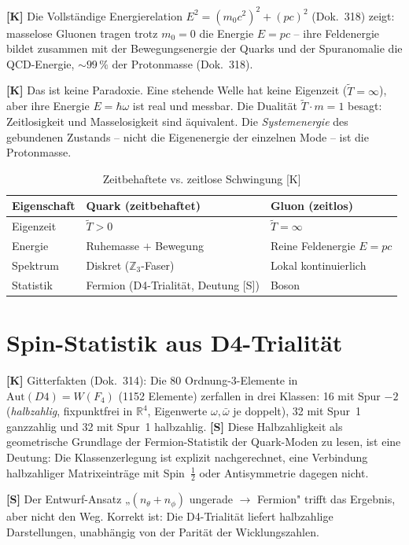 \textbf{[K]} Die Vollständige Energierelation
$E^2 = (m_0 c^2)^2 + (pc)^2$ (Dok.~318) zeigt: masselose Gluonen
tragen trotz $m_0 = 0$ die Energie $E = pc$ -- ihre Feldenergie bildet
zusammen mit der Bewegungsenergie der Quarks und der Spuranomalie die
QCD-Energie, $\sim 99\,\%$ der Protonmasse (Dok.~318).

\textbf{[K]} Das ist keine Paradoxie. Eine stehende Welle hat keine
Eigenzeit ($\tilde{T} = \infty$), aber ihre Energie $E = \hbar\omega$
ist real und messbar. Die Dualität $\tilde{T} \cdot m = 1$ besagt:
Zeitlosigkeit und Masselosigkeit sind äquivalent. Die
\emph{Systemenergie} des gebundenen Zustands -- nicht die Eigenenergie
der einzelnen Mode -- ist die Protonmasse.

\begin{table}[h]
\centering
\caption{Zeitbehaftete vs. zeitlose Schwingung [K]}
\begin{tabular}{lll}
\toprule
Eigenschaft & Quark (zeitbehaftet) & Gluon (zeitlos) \\
\midrule
Eigenzeit & $\tilde{T} > 0$ & $\tilde{T} = \infty$ \\
Energie & Ruhemasse $+$ Bewegung & Reine Feldenergie $E = pc$ \\
Spektrum & Diskret ($\mathbb{Z}_3$-Faser) & Lokal kontinuierlich \\
Statistik & Fermion (D4-Trialität, Deutung [S]) & Boson \\
\bottomrule
\end{tabular}
\end{table}

\section{Spin-Statistik aus D4-Trialität}

\textbf{[K]} Gitterfakten (Dok.~314): Die 80 Ordnung-3-Elemente in
$\text{Aut}(D4) = W(F_4)$ (1152 Elemente) zerfallen in drei Klassen:
16 mit Spur $-2$ (\emph{halbzahlig}, fixpunktfrei in $\mathbb{R}^4$,
Eigenwerte $\omega,\bar\omega$ je doppelt), 32 mit Spur~1 ganzzahlig
und 32 mit Spur~1 halbzahlig.
\textbf{[S]} Diese Halbzahligkeit als geometrische Grundlage der
Fermion-Statistik der Quark-Moden zu lesen, ist eine Deutung: Die
Klassenzerlegung ist explizit nachgerechnet, eine Verbindung halbzahliger
Matrixeinträge mit Spin~$\tfrac12$ oder Antisymmetrie dagegen nicht.

\textbf{[S]} Der Entwurf-Ansatz „$(n_\theta + n_\phi)$ ungerade
$\to$ Fermion" trifft das Ergebnis, aber nicht den Weg. Korrekt ist:
Die D4-Trialität liefert halbzahlige Darstellungen, unabhängig von der
Parität der Wicklungszahlen.

